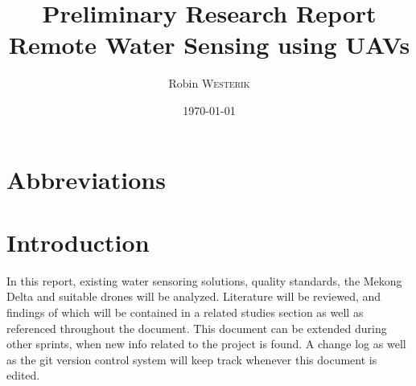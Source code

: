\documentclass[11pt, a4paper]{article}
\title{Preliminary Research Report\\Remote Water Sensing using UAVs}
\author{Robin \textsc{Westerik}}
\date{\today}
\begin{document}



\tableofcontents
\pagebreak

\section{Abbreviations}
\sffamily\footnotesize
\printnomenclature
\rmfamily\normalsize

\section{Introduction}

In this report, existing water sensoring solutions, quality standards, the Mekong Delta and suitable drones will be analyzed. Literature will be reviewed, and findings of which will be contained in a related studies section as well as referenced throughout the document. This document can be extended during other sprints, when new info related to the project is found. A change log as well as the git version control system \cite{git} will keep track whenever this document is edited. 






\appendix



\pagebreak
\printbibliography 
\end{document}
